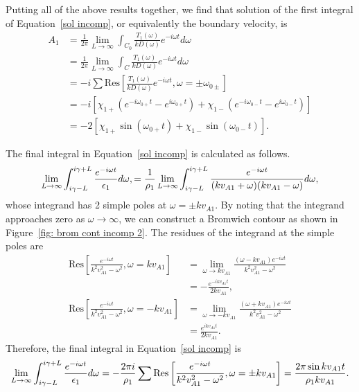 \documentclass{aastex61}
\begin{document}
Putting all of the above results together, we find that solution of the first integral of Equation~\eqref{sol incomp}, or equivalently the boundary velocity, is
\begin{align}
A_1 &= \frac{1}{2\pi} \lim_{L \to \infty} \int_{C_0} \frac{T_1(\omega)}{kD(\omega)} e^{-i\omega t} d\omega \\
&= \frac{1}{2\pi} \lim_{L \to \infty} \int_{C} \frac{T_1(\omega)}{kD(\omega)} e^{-i\omega t} d\omega \\
&= -i \sum \mathrm{Res}\left[\frac{T_1(\omega)}{kD(\omega)}e^{-i\omega t}, \omega = \pm \omega_{0\pm} \right] \\
&= -i [\chi_{1+} (e^{-i\omega_{0+} t} - e^{i\omega_{0+} t}) + \chi_{1-} (e^{-i\omega_{0-} t} - e^{i\omega_{0-} t})] \\
&= -2 [\chi_{1+} \sin(\omega_{0+} t) + \chi_{1-} \sin(\omega_{0-} t)].
\end{align}


The final integral in Equation~\eqref{sol incomp} is calculated as follows.
\begin{equation}
\lim_{L \to \infty} \int_{i\gamma - L}^{i\gamma + L} \frac{e^{-i\omega t}}{\e_1} d\omega,
= \frac{1}{\rho_1}\lim_{L \to \infty} \int_{i\gamma - L}^{i\gamma + L} \frac{e^{-i\omega t}}{(kv_{A1} + \omega)(kv_{A1} - \omega)} d\omega,
\end{equation}
whose integrand has 2 simple poles at $\omega = \pm k v_{A1}$. By noting that the integrand approaches zero as $\omega \to \infty$, we can construct a Bromwich contour as shown in Figure~\ref{fig: brom cont incomp 2}. The residues of the integrand at the simple poles are
\begin{align}
\mathrm{Res}\left[\frac{e^{-i\omega t}}{k^2v_{A1}^2 - \omega^2}, \omega = kv_{A1} \right] &= 
\lim_{\omega \to kv_{A1}} \frac{(\omega - kv_{A1})e^{-i\omega t}}{k^2v_{A1}^2 - \omega^2} \\ 
&= -\frac{e^{-ikv_{A1} t}}{2kv_{A1}}, \\
\mathrm{Res}\left[\frac{e^{-i\omega t}}{k^2v_{A1}^2 - \omega^2}, \omega = -kv_{A1} \right] &= 
\lim_{\omega \to -kv_{A1}} \frac{(\omega + kv_{A1})e^{-i\omega t}}{k^2v_{A1}^2 - \omega^2} \\ 
&= \frac{e^{ikv_{A1} t}}{2kv_{A1}}.
\end{align}
Therefore, the final integral in Equation~\eqref{sol incomp} is
\begin{equation}
\lim_{L \to \infty} \int_{i\gamma - L}^{i\gamma + L} \frac{e^{-i\omega t}}{\e_1} d\omega = -\frac{2\pi i}{\rho_1} \sum \mathrm{Res} \left[ \frac{e^{-i\omega t}}{k^2v_{A1}^2 - \omega^2}, \omega = \pm kv_{A1} \right] = \frac{2\pi \sin{kv_{A1}t}}{\rho_1 k v_{A1}}.
\end{equation}
\end{document}
